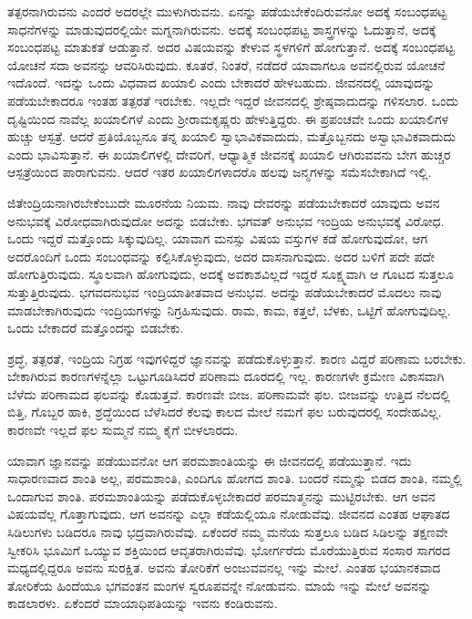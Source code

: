 ತತ್ಪರನಾಗಿರುವನು ಎಂದರೆ ಅದರಲ್ಲೇ ಮುಳುಗಿರುವನು. ಏನನ್ನು ಪಡೆಯಬೇಕೆಂದಿರು\-ವನೋ ಅದಕ್ಕೆ ಸಂಬಂಧಪಟ್ಟ ಸಾಧನೆಗಳನ್ನು ಮಾಡುವುದರಲ್ಲಿಯೇ ಮಗ್ನನಾಗಿರುವನು. ಅದಕ್ಕೆ ಸಂಬಂಧಪಟ್ಟ ಶಾಸ್ತ್ರಗಳನ್ನು ಓದುತ್ತಾನೆ, ಅದಕ್ಕೆ ಸಂಬಂಧಪಟ್ಟ ಮಾತುಕತೆ ಆಡುತ್ತಾನೆ. ಅದರ ವಿಷಯವನ್ನು ಕೇಳುವ ಸ್ಥಳಗಳಿಗೆ ಹೋಗುತ್ತಾನೆ. ಅದಕ್ಕೆ ಸಂಬಂಧಪಟ್ಟ ಯೋಚನೆ ಸದಾ ಅವನನ್ನು ಆವರಿಸಿರುವುದು. ಕೂತರೆ, ನಿಂತರೆ, ನಡೆದರೆ ಯಾವಾಗಲೂ ಅವನಲ್ಲಿರುವ ಯೋಚನೆ ಇದೊಂದೆ. ಇದನ್ನು ಒಂದು ವಿಧವಾದ ಖಯಾಲಿ ಎಂದು ಬೇಕಾದರೆ ಹೇಳಬಹುದು. ಜೀವನದಲ್ಲಿ ಯಾವುದನ್ನು ಪಡೆಯಬೇಕಾದರೂ ಇಂತಹ ತತ್ಪರತೆ ಇರಬೇಕು. ಇಲ್ಲದೇ ಇದ್ದರೆ ಜೀವನದಲ್ಲಿ ಶ್ರೇಷ್ಠವಾದುದನ್ನು ಗಳಿಸಲಾರ. ಒಂದು ದೃಷ್ಟಿಯಿಂದ ನಾವೆಲ್ಲ ಖಯಾಲಿಗಳೆ ಎಂದು ಶ‍್ರೀರಾಮಕೃಷ್ಣರು ಹೇಳುತ್ತಿದ್ದರು. ಈ ಪ್ರಪಂಚವೇ ಒಂದು ಖಯಾಲಿಗಳ ಹುಚ್ಚು ಆಸ್ಪತ್ರೆ. ಆದರೆ ಪ್ರತಿಯೊಬ್ಬನೂ ತನ್ನ ಖಯಾಲಿ ಸ್ವಾಭಾವಿಕವಾದುದು, ಮತ್ತೊಬ್ಬನದು ಅಸ್ವಾಭಾವಿಕವಾದುದು ಎಂದು ಭಾವಿಸುತ್ತಾನೆ. ಈ ಖಯಾಲಿಗಳಲ್ಲಿ ದೇವರಿಗೆ, ಆಧ್ಯಾತ್ಮಿಕ ಜೀವನಕ್ಕೆ ಖಯಾಲಿ ಆಗಿರುವವನು ಬೇಗ ಹುಚ್ಚರ ಆಸ್ಪತ್ರೆಯಿಂದ ಪಾರಾಗುವನು. ಆದರೆ ಇತರ ಖಯಾಲಿಗಳಾದರೊ ಹಲವು ಜನ್ಮಗಳನ್ನು ಸಮೆಸಬೇಕಾಗಿದೆ ಇಲ್ಲಿ.

ಜಿತೇಂದ್ರಿಯನಾಗಿರಬೇಕೆಂಬುದೇ ಮೂರನೆಯ ನಿಯಮ. ನಾವು ದೇವರನ್ನು ಪಡೆಯ\-ಬೇಕಾದರೆ ಯಾವುದು ಅವನ ಅನುಭವಕ್ಕೆ ವಿರೋಧವಾಗಿರುವುದೋ ಅದನ್ನು ಬಿಡಬೇಕು. ಭಗವತ್ ಅನುಭವ ಇಂದ್ರಿಯ ಅನುಭವಕ್ಕೆ ವಿರೋಧ. ಒಂದು ಇದ್ದರೆ ಮತ್ತೊಂದು ಸಿಕ್ಕುವುದಿಲ್ಲ. ಯಾವಾಗ ಮನಸ್ಸು ವಿಷಯ ವಸ್ತುಗಳ ಕಡೆ ಹೋಗುವುದೋ, ಆಗ ಅದರೊಂದಿಗೆ ಒಂದು ಸಂಬಂಧವನ್ನು ಕಲ್ಪಿಸಿಕೊಳ್ಳುವುದು, ಅದರ ದಾಸನಾಗುವುದು. ಅದರ ಬಳಿಗೆ ಪದೇ ಪದೇ ಹೋಗುತ್ತಿರುವುದು. ಸ್ಥೂಲವಾಗಿ ಹೋಗುವುದು, ಅದಕ್ಕೆ ಅವಕಾಶವಿಲ್ಲದೆ ಇದ್ದರೆ ಸೂಕ್ಷ್ಮವಾಗಿ ಆ ಗೂಟದ ಸುತ್ತಲೂ ಸುತ್ತುತ್ತಿರುವುದು. ಭಗವದನುಭವ ಇಂದ್ರಿಯಾತೀತವಾದ ಅನುಭವ. ಅದನ್ನು ಪಡೆಯಬೇಕಾದರೆ ಮೊದಲು ನಾವು ಮಾಡಬೇಕಾಗಿರುವುದು ಇಂದ್ರಿಯಗಳನ್ನು ನಿಗ್ರಹಿಸುವುದು. ರಾಮ, ಕಾಮ, ಕತ್ತಲೆ, ಬೆಳಕು, ಒಟ್ಟಿಗೆ ಹೋಗುವುದಿಲ್ಲ. ಒಂದು ಬೇಕಾದರೆ ಮತ್ತೊಂದನ್ನು ಬಿಡಬೇಕು.

ಶ್ರದ್ಧೆ, ತತ್ಪರತೆ, ಇಂದ್ರಿಯ ನಿಗ್ರಹ ಇವುಗಳಿದ್ದರೆ ಜ್ಞಾನವನ್ನು ಪಡೆದುಕೊಳ್ಳುತ್ತಾನೆ. ಕಾರಣ ವಿದ್ದರೆ ಪರಿಣಾಮ ಬರಬೇಕು. ಬೇಕಾಗಿರುವ ಕಾರಣಗಳನ್ನೆಲ್ಲಾ ಒಟ್ಟುಗೂಡಿಸಿದರೆ ಪರಿಣಾಮ ದೂರದಲ್ಲಿ ಇಲ್ಲ. ಕಾರಣಗಳೇ ಕ್ರಮೇಣ ವಿಕಾಸವಾಗಿ ಬೆಳೆದು ಪರಿಣಾಮದ ಫಲವನ್ನು ಕೊಡುತ್ತವೆ. ಕಾರಣವೇ ಬೀಜ. ಪರಿಣಾಮವೇ ಫಲ. ಬೀಜವನ್ನು ಉತ್ತಿದ ನೆಲದಲ್ಲಿ ಬಿತ್ತಿ, ಗೊಬ್ಬರ ಹಾಕಿ, ಶ್ರದ್ಧೆಯಿಂದ ಬೆಳೆಸಿದರೆ ಕೆಲವು ಕಾಲದ ಮೇಲೆ ನಮಗೆ ಫಲ ಬರುವುದರಲ್ಲಿ ಸಂದೇಹವಿಲ್ಲ. ಕಾರಣವೇ ಇಲ್ಲದೆ ಫಲ ಸುಮ್ಮನೆ ನಮ್ಮ ಕೈಗೆ ಬೀಳಲಾರದು.

ಯಾವಾಗ ಜ್ಞಾನವನ್ನು ಪಡೆಯುವನೋ ಆಗ ಪರಮಶಾಂತಿಯನ್ನು ಈ ಜೀವನದಲ್ಲಿ ಪಡೆ\-ಯುತ್ತಾನೆ. ಇದು ಸಾಧಾರಣವಾದ ಶಾಂತಿ ಅಲ್ಲ, ಪರಮಶಾಂತಿ, ಎಂದಿಗೂ ಹೋಗದ ಶಾಂತಿ. ಬಂದರೆ ನಮ್ಮನ್ನು ಬಿಡದ ಶಾಂತಿ, ನಮ್ಮಲ್ಲಿ ಒಂದಾಗುವ ಶಾಂತಿ. ಪರಮಶಾಂತಿಯನ್ನು ಪಡೆದುಕೊಳ್ಳಬೇಕಾದರೆ ಪರಮಾತ್ಮನನ್ನು ಮುಟ್ಟಿರಬೇಕು. ಆಗ ಅವನ ವಿಷಯವೆಲ್ಲ ಗೊತ್ತಾಗುವುದು. ಆಗ ಅವನನ್ನು ಎಲ್ಲಾ ಕಡೆಯಲ್ಲಿಯೂ ನೋಡುವೆವು. ಜೀವನದ ಎಂತಹ ಆಘಾತದ ಸಿಡಿಲುಗಳು ಬಡಿದರೂ ನಾವು ಭದ್ರವಾಗಿರುವೆವು. ಏಕೆಂದರೆ ನಮ್ಮ ಮನೆಯ ಸುತ್ತಲೂ ಬಡಿದ ಸಿಡಿಲನ್ನು ತಕ್ಷಣವೇ ಸ್ವೀಕರಿಸಿ ಭೂಮಿಗೆ ಒಯ್ಯುವ ಶಕ್ತಿಯಿಂದ ಆವೃತರಾಗಿರುವೆವು. ಭೋರ್ಗರೆದು ಮೊರೆಯುತ್ತಿರುವ ಸಂಸಾರ ಸಾಗರದ ಮಧ್ಯದಲ್ಲಿದ್ದರೂ ಅವನು ಸುರಕ್ಷಿತ. ಅವನು ತೋರಿಕೆಗೆ ಅಂಜುವವನಲ್ಲ ಇನ್ನು ಮೇಲೆ. ಎಂತಹ ಭಯಾನಕವಾದ ತೋರಿಕೆಯ ಹಿಂದೆಯೂ ಭಗವಂತನ ಮಂಗಳ ಸ್ವರೂಪವನ್ನೇ ನೋಡುವನು. ಮಾಯೆ ಇನ್ನು ಮೇಲೆ ಅವನನ್ನು ಕಾಡಲಾರಳು. ಏಕೆಂದರೆ ಮಾಯಾಧಿಪತಿಯನ್ನು ಇವನು ಕಂಡಿರುವನು.

